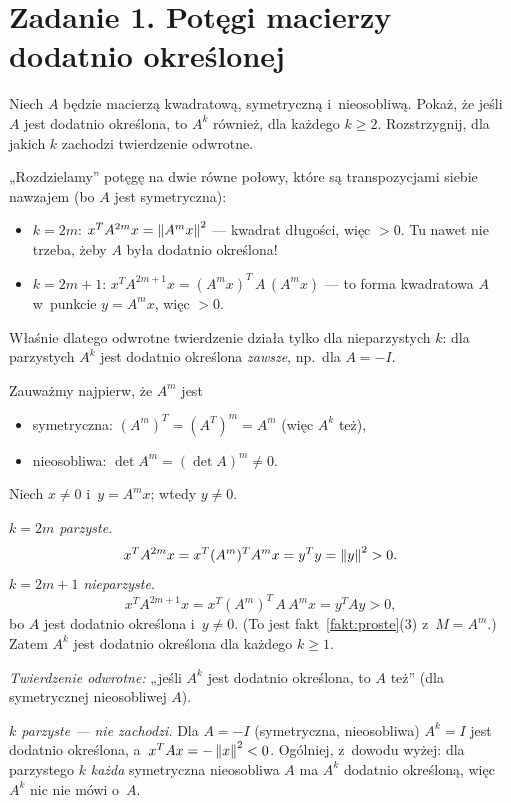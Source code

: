 \documentclass[11pt]{article}
\begin{document}
\section{Zadanie 1. Potęgi macierzy dodatnio określonej}
\begin{tresc}
Niech $A$ będzie macierzą kwadratową, symetryczną i~nieosobliwą. Pokaż,
że jeśli $A$ jest dodatnio określona, to $A^k$ również, dla każdego
$k\ge2$. Rozstrzygnij, dla jakich $k$ zachodzi twierdzenie odwrotne.
\end{tresc}

\begin{intuicja}
„Rozdzielamy” potęgę na dwie równe połowy, które są transpozycjami
siebie nawzajem (bo $A$ jest symetryczna):
\begin{itemize}
\item $k=2m$: $x^TA^{2m}x=\left\lVert A^mx \right\rVert^2$ --- kwadrat długości,
więc $>0$. Tu nawet nie trzeba, żeby $A$ była dodatnio określona!
\item $k=2m+1$: $x^TA^{2m+1}x=(A^mx)^T\,A\,(A^mx)$ --- to forma kwadratowa
$A$ w~punkcie $y=A^mx$, więc $>0$.
\end{itemize}
Właśnie dlatego odwrotne twierdzenie działa tylko dla nieparzystych $k$:
dla parzystych $A^k$ jest dodatnio określona \emph{zawsze}, np.\ dla $A=-I$.
\end{intuicja}

\formalnie
Zauważmy najpierw, że $A^m$ jest
\begin{itemize}
\item symetryczna: $(A^m)^T=(A^T)^m=A^m$ (więc $A^k$ też),
\item nieosobliwa: $\det A^m=(\det A)^m\ne0$.
\end{itemize} Niech $x\ne0$ i~$y=A^mx$; wtedy
$y\ne0$.

\emph{$k=2m$ parzyste.}
\[
x^TA^{2m}x=x^T(A^m)^TA^mx=y^Ty=\left\lVert y \right\rVert^2>0.
\]
\emph{$k=2m+1$ nieparzyste.}
\[
x^TA^{2m+1}x=x^T(A^m)^T\,A\,A^mx=y^TAy>0,
\]
bo $A$ jest dodatnio określona i~$y\ne0$. (To jest fakt~\ref{fakt:proste}(3)
z~$M=A^m$.) Zatem $A^k$ jest dodatnio określona dla każdego $k\ge1$.

\emph{Twierdzenie odwrotne:} „jeśli $A^k$ jest dodatnio określona, to $A$
też” (dla symetrycznej nieosobliwej $A$).

\emph{$k$ parzyste --- nie zachodzi.} Dla $A=-I$ (symetryczna, nieosobliwa)
$A^k=I$ jest dodatnio określona, a~$x^TAx=-\left\lVert x \right\rVert^2<0$. Ogólniej, z~dowodu
wyżej: dla parzystego $k$ \emph{każda} symetryczna nieosobliwa $A$ ma
$A^k$ dodatnio określoną, więc $A^k$ nic nie mówi o~$A$.
\end{document}
